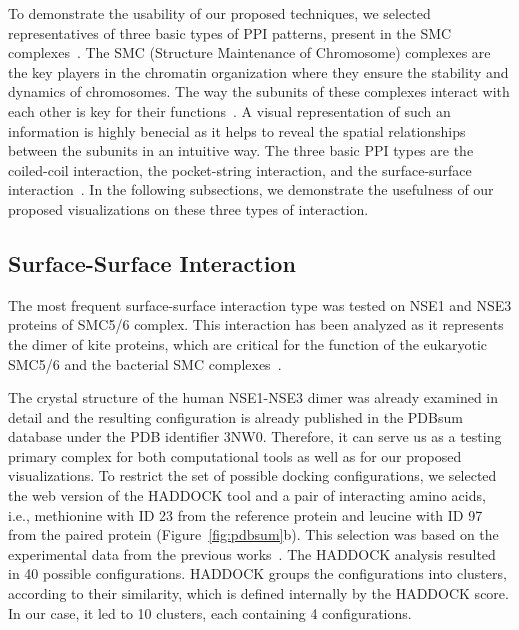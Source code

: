 \documentclass{bmcart}
\begin{document}
To demonstrate the usability of our proposed techniques, we selected representatives of three basic types of PPI patterns,  present in the SMC complexes~\cite{Palecek2015}. 
The SMC (Structure Maintenance of Chromosome) complexes are the key players in the chromatin organization where they ensure the stability and dynamics of chromosomes. The way the subunits of these complexes interact with each other is key for their functions~\cite{Gligoris}.
A visual representation of such an information is highly benecial as it helps to reveal the spatial relationships between the subunits in an intuitive way.
The three basic PPI types are the coiled-coil interaction, the pocket-string interaction, and the surface-surface interaction~\cite{alberts02molecular}.
In the following subsections, we demonstrate the usefulness of our proposed visualizations on these three types of interaction.

\subsection*{Surface-Surface Interaction}
The most frequent surface-surface interaction type was tested on NSE1 and NSE3 proteins of SMC5/6 complex. 
This interaction has been analyzed as it represents the dimer of kite proteins, which are critical for the function of the eukaryotic SMC5/6 and the bacterial SMC complexes~\cite{Zabrady2016,Palecek2015,Doyle2010}. 

The crystal structure of the human NSE1-NSE3 dimer was already examined in detail and the resulting configuration is already published in the PDBsum database under the PDB identifier 3NW0. 
Therefore, it can serve us as a testing primary complex for both computational tools as well as for our proposed visualizations.
To restrict the set of possible docking configurations, we selected the web version of the HADDOCK tool and a pair of interacting amino acids, i.e., methionine with ID 23 from the reference protein and leucine with ID 97 from the paired protein (Figure~\ref{fig:pdbsum}b).
This selection was based on the experimental data from the previous works~\cite{Doyle2010,Hudson2011,Kozakova,Crabben}.
The HADDOCK analysis resulted in 40 possible configurations.
HADDOCK groups the configurations into clusters, according to their similarity, which is defined internally by the HADDOCK score.
In our case, it led to 10 clusters, each containing 4 configurations.
\end{document}
